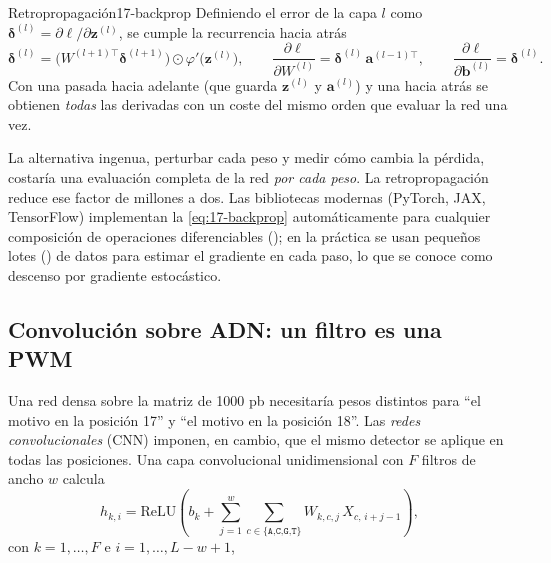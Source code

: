 \begin{teorema}{Retropropagación}{17-backprop}
Definiendo el error de la capa $l$ como $\boldsymbol\delta^{(l)}=\partial\ell/\partial\mathbf{z}^{(l)}$, se cumple la recurrencia hacia atrás
\begin{equation}\label{eq:17-backprop}
\boldsymbol\delta^{(l)} = \Big(W^{(l+1)\top}\boldsymbol\delta^{(l+1)}\Big)\odot\varphi'\big(\mathbf{z}^{(l)}\big),
\qquad
\frac{\partial\ell}{\partial W^{(l)}} = \boldsymbol\delta^{(l)}\,\mathbf{a}^{(l-1)\top},\qquad
\frac{\partial\ell}{\partial \mathbf{b}^{(l)}} = \boldsymbol\delta^{(l)}.
\end{equation}
Con una pasada hacia adelante (que guarda $\mathbf{z}^{(l)}$ y $\mathbf{a}^{(l)}$) y una hacia atrás se obtienen \emph{todas} las derivadas con un coste del mismo orden que evaluar la red una vez.
\end{teorema}

\begin{simbolos}
\end{simbolos}

La alternativa ingenua, perturbar cada peso y medir cómo cambia la pérdida, costaría una evaluación completa de la red \emph{por cada peso}. La retropropagación reduce ese factor de millones a dos. Las bibliotecas modernas (PyTorch, JAX, TensorFlow) implementan la \cref{eq:17-backprop} automáticamente para cualquier composición de operaciones diferenciables (); en la práctica se usan pequeños lotes () de datos para estimar el gradiente en cada paso, lo que se conoce como descenso por gradiente estocástico.

\subsection{Convolución sobre ADN: un filtro es una PWM}

Una red densa sobre la matriz  de 1000 pb necesitaría pesos distintos para ``el motivo en la posición 17'' y ``el motivo en la posición 18''. Las \emph{redes convolucionales} (CNN) imponen, en cambio, que el mismo detector se aplique en todas las posiciones. Una capa convolucional unidimensional con $F$ filtros de ancho $w$ calcula
\begin{equation}\label{eq:17-conv}
h_{k,i} = \mathrm{ReLU}\!\left(b_k + \sum_{j=1}^{w}\sum_{c\in\{\texttt{A,C,G,T}\}} W_{k,c,j}\,X_{c,\,i+j-1}\right),
\end{equation}
con $k=1,\dots,F$ e $i=1,\dots,L-w+1$,

